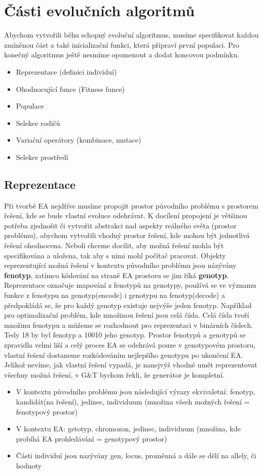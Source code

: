 \section{Části evolučních algoritmů}
Abychom vytvořili běhu schopný evoluční algoritmus, musíme specifikovat každou zmíněnou část a také inicializační funkci, která připraví první populaci. Pro konečný algoritmus ještě nesmíme opomenout a dodat koncovou podmínku. 
\begin{itemize}
\item{Reprezentace (definici individuí)}
\item{Ohodnocující funce (Fitness funce)}
\item{Populace}
\item{Selekce rodičů}
\item{Variační operátory (kombinace, mutace)}
\item{Selekce prostředí}
\end{itemize}
\subsection{Reprezentace}
Při tvorbě EA nejdříve musíme propojit prostor původního problému s prostorem řešení, kde se bude vlastní evoluce odehrávat. K docílení propojení je většinou potřeba zjednošit či vytvořit abstrakci nad aspekty reálného světa (prostor problému), abychom vytvořili vhodný prostor řešení, kde mohou být jednotlivá řešení ohodnocena. Neboli chceme docílit, aby možná řešení mohla být specifikována a uložena, tak aby s nimi mohl počítač pracovat. Objekty reprezentující možná řešení v kontextu původního problému jsou názývány \textbf{fenotyp}, zatímco kódování na straně EA prostoru se jim říká \textbf{genotyp}. Reprezentace označuje mapování z fenotypů na genotypy, používá se ve významu funkce z fenotypu na genotyp(encode) i genotypu na fenotyp(decode) a předpokládá se, že pro každý genotyp existuje nejvýše jeden fenotyp. Například pro optimalizační problém, kde množinou řešení jsou celá čísla. Celá čísla tvoří množinu fenotypu a můžeme se rozhodnout pro reprezentaci v binárních číslech. Tedy 18 by byl fenotyp a 10010 jeho genotyp. Prostor fenotypů a genotypů se zpravidla velmi liší a celý proces EA se odehrává pouze v genotypovém prostoru, vlastní řešení dostaneme rozkódováním nejlepšího genotypu po ukončení EA. Jelikož nevíme, jak vlastní řešení vypadá, je nanejvýš vhodné umět reprezentovat všechny možná řešení, v G\&T bychom řekli, že generátor je kompletní.
\begin{itemize}   
  \item V kontextu původního problému jsou následující výrazy ekvivaletní: fenotyp, kandidát(na řešení), jedinec, individuum (množina všech možných řešení = fenotypový prostor)
  \item V kontextu EA: getotyp, chromozon, jedinec, individuum (množina, kde probíhá EA prohledávání = genotypový prostor)
  \item Části individuí jsou nazývány gen, locus, proměnná a dále se dělí na allely, či hodnoty
  \end{itemize}
